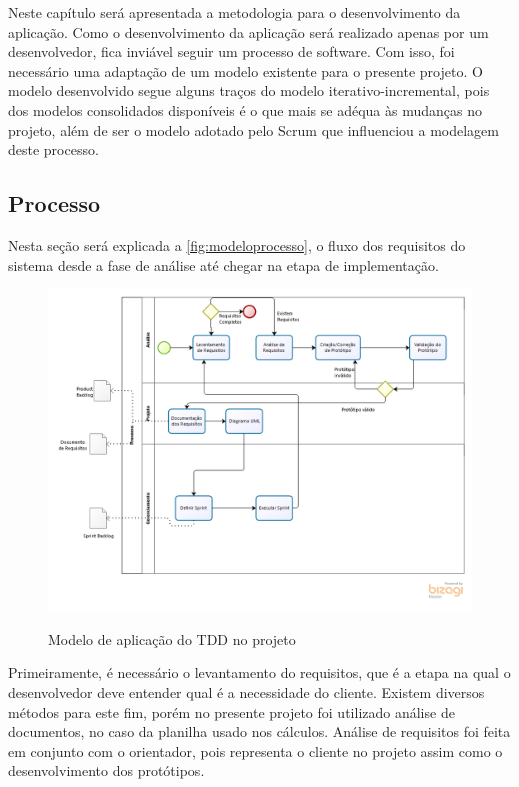 Neste capítulo será apresentada a metodologia para o desenvolvimento da aplicação. Como o desenvolvimento da aplicação será realizado apenas por um desenvolvedor, fica inviável seguir um processo de software. Com isso, foi necessário uma adaptação de um modelo existente para o presente projeto. O modelo desenvolvido segue alguns traços do modelo iterativo-incremental, pois dos modelos consolidados disponíveis é o que mais se adéqua às mudanças no projeto, além de ser o modelo adotado pelo Scrum que influenciou a modelagem deste processo.

\subsection{Processo}
\label{sub:processo}
Nesta seção será explicada a \autoref{fig:modeloprocesso}, o fluxo dos requisitos do sistema desde a fase de análise até chegar na etapa de implementação.

\begin{figure}[H]
    \centering
    \caption{Modelo de aplicação do TDD no projeto}
    \includegraphics[width=13cm]{dados/figuras/ModeloDoProcesso.png}
    \label{fig:modeloprocesso}
\end{figure}

Primeiramente, é necessário o levantamento do requisitos, que é a etapa na qual o desenvolvedor deve entender qual é a necessidade do cliente. Existem diversos métodos para este fim, porém no presente projeto foi utilizado análise de documentos, no caso da planilha usado nos cálculos. Análise de requisitos foi feita em conjunto com o orientador, pois representa o cliente no projeto assim como o desenvolvimento dos protótipos. 

